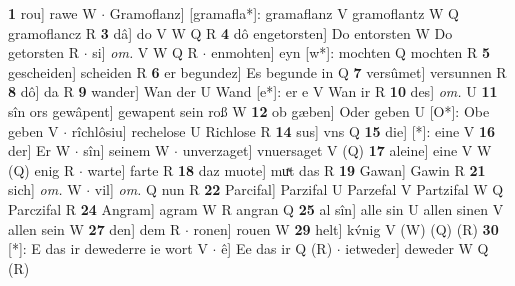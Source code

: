 \documentclass[8pt,a4paper,notitlepage]{article}
\begin{document}
\begin{table}[ht]
\begin{minipage}[t]{0.5\linewidth}
\textbf{1} rou] rawe W  $\cdot$ Gramoflanz] [gramafla*]: gramaflanz V gramoflantz W Q gramoflancz R \textbf{3} dâ] do V W Q R \textbf{4} dô engetorsten] Do entorsten W Do getorsten R  $\cdot$ si] \textit{om.} V W Q R  $\cdot$ enmohten] eyn [w*]: mochten Q mochten R \textbf{5} gescheiden] scheiden R \textbf{6} er begundez] Es begunde in Q \textbf{7} versûmet] versunnen R \textbf{8} dô] da R \textbf{9} wander] Wan der U Wand [e*]: er e V Wan ir R \textbf{10} des] \textit{om.} U \textbf{11} sîn ors gewâpent] gewapent sein roß W \textbf{12} ob gæben] Oder geben U [O*]: Obe geben V  $\cdot$ rîchlôsiu] rechelose U Richlose R \textbf{14} sus] vns Q \textbf{15} die] [*]: eine V \textbf{16} der] Er W  $\cdot$ sîn] seinem W  $\cdot$ unverzaget] vnuersaget V (Q) \textbf{17} aleine] eine V W (Q) enig R  $\cdot$ warte] farte R \textbf{18} daz muote] muͯt das R \textbf{19} Gawan] Gawin R \textbf{21} sich] \textit{om.} W  $\cdot$ vil] \textit{om.} Q nun R \textbf{22} Parcifal] Parzifal U Parzefal V Partzifal W Q Parczifal R \textbf{24} Angram] agram W R angran Q \textbf{25} al sîn] alle sin U allen sinen V allen sein W \textbf{27} den] dem R  $\cdot$ ronen] rouen W \textbf{29} helt] kv́nig V (W) (Q) (R) \textbf{30} [*]: E das ir dewederre ie wort V  $\cdot$ ê] Ee das ir Q (R)  $\cdot$ ietweder] deweder W Q (R) \newline
\end{minipage}
\end{table}
\end{document}
